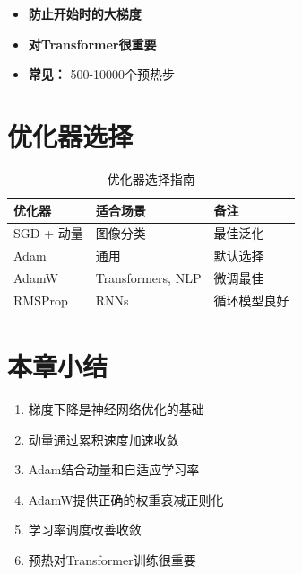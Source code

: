\begin{properties}[预热]
\begin{itemize}
    \item \textbf{防止开始时的大梯度}
    \item \textbf{对Transformer很重要}
    \item \textbf{常见：} 500-10000个预热步
\end{itemize}
\end{properties}

\section{优化器选择}

\begin{table}[h]
    \centering
    \caption{优化器选择指南}
    \begin{tabular}{L{2.5cm} L{3cm} L{3.5cm}}
        \toprule
        \textbf{优化器} & \textbf{适合场景} & \textbf{备注} \\
        \midrule
        SGD + 动量 & 图像分类 & 最佳泛化 \\
        Adam & 通用 & 默认选择 \\
        AdamW & Transformers, NLP & 微调最佳 \\
        RMSProp & RNNs & 循环模型良好 \\
        \bottomrule
    \end{tabular}
\end{table}

\section{本章小结}

\begin{enumerate}
    \item 梯度下降是神经网络优化的基础
    \item 动量通过累积速度加速收敛
    \item Adam结合动量和自适应学习率
    \item AdamW提供正确的权重衰减正则化
    \item 学习率调度改善收敛
    \item 预热对Transformer训练很重要
\end{enumerate}
